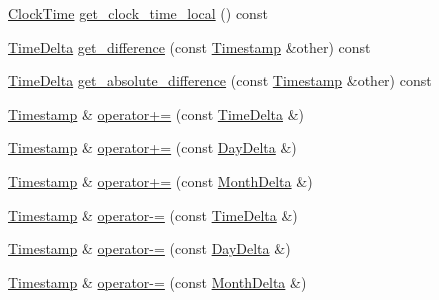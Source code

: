 \begin{DoxyCompactItemize}
\hyperlink{structClockTime}{\-Clock\-Time} \hyperlink{structTimestamp_a773a47fcdd02afef5d307bcc65561f8c}{get\-\_\-clock\-\_\-time\-\_\-local} () const 
\item 
\hyperlink{structTimeDelta}{\-Time\-Delta} \hyperlink{structTimestamp_a7d78f2151082c1c080364e2676b88d35}{get\-\_\-difference} (const \hyperlink{structTimestamp}{\-Timestamp} \&other) const 
\item 
\hyperlink{structTimeDelta}{\-Time\-Delta} \hyperlink{structTimestamp_abfe068b22473f173011e7907a0fd8a9c}{get\-\_\-absolute\-\_\-difference} (const \hyperlink{structTimestamp}{\-Timestamp} \&other) const 
\item 
\hyperlink{structTimestamp}{\-Timestamp} \& \hyperlink{structTimestamp_ac2348d7a44a83019af671af64bce3251}{operator+=} (const \hyperlink{structTimeDelta}{\-Time\-Delta} \&)
\item 
\hyperlink{structTimestamp}{\-Timestamp} \& \hyperlink{structTimestamp_abfa4b1739e1ac43a76993ca40a937a1f}{operator+=} (const \hyperlink{structDayDelta}{\-Day\-Delta} \&)
\item 
\hyperlink{structTimestamp}{\-Timestamp} \& \hyperlink{structTimestamp_ad8c5dbb58c51005157c1ca2ef9a16f3d}{operator+=} (const \hyperlink{structMonthDelta}{\-Month\-Delta} \&)
\item 
\hyperlink{structTimestamp}{\-Timestamp} \& \hyperlink{structTimestamp_a61f52e1ead63b1a3d1752de6107dde2c}{operator-\/=} (const \hyperlink{structTimeDelta}{\-Time\-Delta} \&)
\item 
\hyperlink{structTimestamp}{\-Timestamp} \& \hyperlink{structTimestamp_aaa8407a2a8742f77ae3d41ae98a369fa}{operator-\/=} (const \hyperlink{structDayDelta}{\-Day\-Delta} \&)
\item 
\hyperlink{structTimestamp}{\-Timestamp} \& \hyperlink{structTimestamp_a1afa88ddd92792bcdbaccf2761ea1988}{operator-\/=} (const \hyperlink{structMonthDelta}{\-Month\-Delta} \&)
\end{DoxyCompactItemize}
